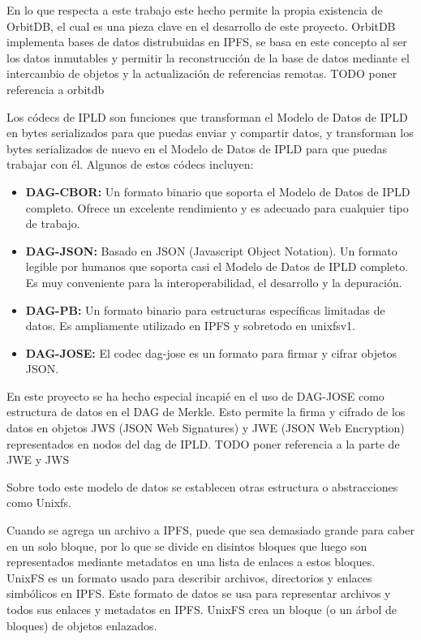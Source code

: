 En lo que respecta a este trabajo este hecho permite la propia existencia de OrbitDB, el cual es una pieza clave en el desarrollo de este proyecto. OrbitDB implementa bases de datos distrubuidas en IPFS, se basa en este concepto al ser los datos inmutables y permitir la reconstrucción de la base de datos mediante el intercambio de objetos y la actualización de referencias remotas.
TODO poner referencia a orbitdb

Los códecs de IPLD son funciones que transforman el Modelo de Datos de IPLD en bytes serializados para que puedas enviar y compartir datos, y transforman los
bytes serializados de nuevo en el Modelo de Datos de IPLD para que puedas trabajar con él. Algunos de estos códecs incluyen:

\begin{itemize}[itemsep=1pt,nolistsep]
      \item \textbf{DAG-CBOR:} Un formato binario que soporta el Modelo de Datos de IPLD completo. Ofrece un excelente rendimiento y es adecuado para cualquier tipo de trabajo.
      \item \textbf{DAG-JSON:} Basado en JSON (Javascript Object Notation). Un formato legible por humanos que soporta casi el Modelo de Datos de IPLD completo. Es muy conveniente para la interoperabilidad, el desarrollo y la depuración.
      \item \textbf{DAG-PB:} Un formato binario para estructuras específicas limitadas de datos. Es ampliamente utilizado en IPFS y sobretodo en unixfsv1.
      \item \textbf{DAG-JOSE:} El codec dag-jose es un formato para firmar y cifrar objetos JSON.
\end{itemize}

En este proyecto se ha hecho especial incapié en el uso de DAG-JOSE como estructura de datos en el DAG de Merkle. Esto permite la firma y cifrado de los datos
en objetos JWS (JSON Web Signatures) y JWE (JSON Web Encryption) representados en nodos del dag de IPLD.
TODO poner referencia a la parte de JWE y JWS

Sobre todo este modelo de datos se establecen otras estructura o abstracciones como Unixfs.

Cuando se agrega un archivo a IPFS, puede que sea demasiado grande para caber en un solo bloque, por lo que se divide en disintos bloques que luego son
representados mediante metadatos en una lista de enlaces a estos bloques. UnixFS es un formato usado para describir archivos, directorios y enlaces simbólicos en
IPFS. Este formato de datos se usa para representar archivos y todos sus enlaces y metadatos en IPFS. UnixFS crea un bloque (o un árbol de bloques) de objetos enlazados.

